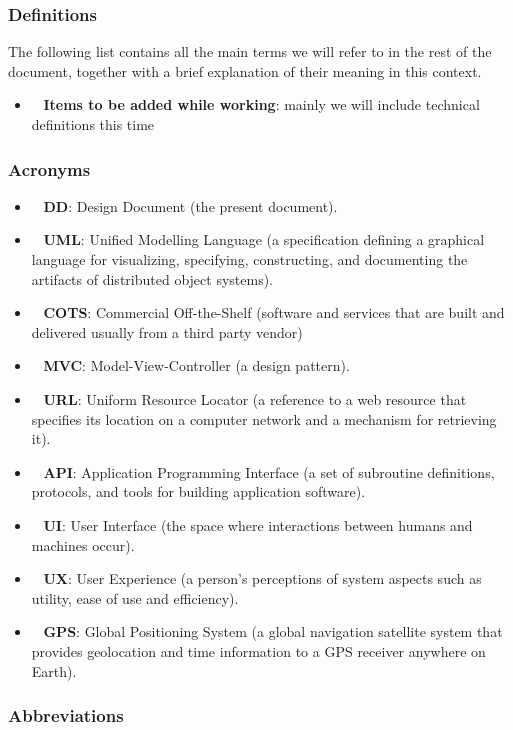 \subsubsection{Definitions}

The following list contains all the main terms we will refer to in the rest of the document, together with a brief explanation of their meaning in this context.

\begin{itemize}
\item~ \textbf{Items to be added while working}: mainly we will include technical definitions this time
\end{itemize}

\subsubsection{Acronyms}

\begin{itemize}
\item~ \textbf{DD}: Design Document (the present document).
\item~ \textbf{UML}: Unified Modelling Language (a specification defining a graphical language for visualizing, specifying, constructing, and documenting the artifacts of distributed object systems).
\item~ \textbf{COTS}: Commercial Off-the-Shelf (software and services that are built and delivered usually from a third party vendor)
\item~ \textbf{MVC}: Model-View-Controller (a design pattern).
\item~ \textbf{URL}: Uniform Resource Locator (a reference to a web resource that specifies its location on a computer network and a mechanism for retrieving it).
\item~ \textbf{API}: Application Programming Interface (a set of subroutine definitions, protocols, and tools for building application software).
\item~ \textbf{UI}: User Interface (the space where interactions between humans and machines occur).
\item~ \textbf{UX}: User Experience (a person’s perceptions of system aspects such as utility, ease of use and efficiency).
\item~ \textbf{GPS}: Global Positioning System (a global navigation satellite system that provides geolocation and time information to a GPS receiver anywhere on Earth).
\end{itemize}

\subsubsection{Abbreviations}

